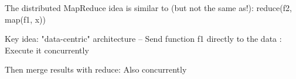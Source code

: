 \documentclass{beamer}
\begin{document}
\begin{slide}{
\item The distributed MapReduce idea is similar to (but not the same as!): reduce(f2, map(f1, x))
\item Key idea: "data-centric" architecture –  Send function f1 directly to the data : Execute it concurrently
\item Then merge results with reduce: Also concurrently
}\end{slide}
\end{document}
